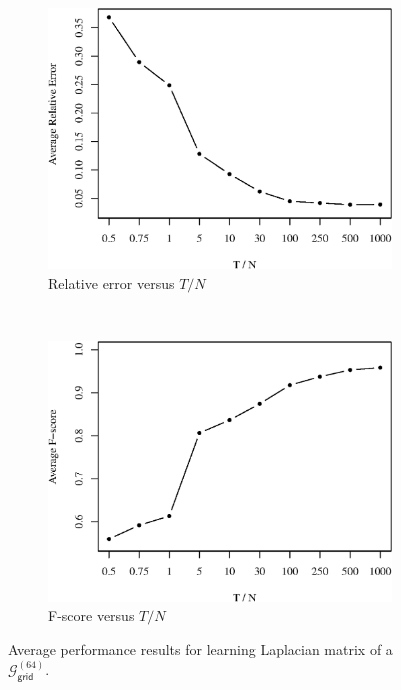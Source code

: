 \documentclass{article}
\begin{document}
\begin{figure}[!htb]
    \centering
    \begin{subfigure}[b]{0.47\textwidth}
        \includegraphics[width=\textwidth]{relative_error.eps}
        \caption{Relative error versus $T/N$}
    \end{subfigure}
    ~ %
    \begin{subfigure}[b]{0.47\textwidth}
        \includegraphics[width=\textwidth]{fscore.eps}
        \caption{F-score versus $T/N$}
    \end{subfigure}
    \caption{Average performance results for learning Laplacian matrix of a $\mathcal{G}^{(64)}_{\mathsf{grid}}$.}
    \label{fig:performance}
\end{figure}
\end{document}

